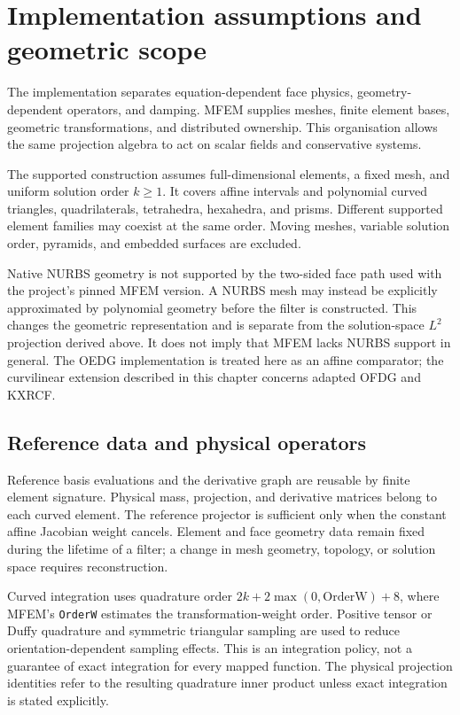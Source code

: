 \section{Implementation assumptions and geometric scope}
\label{chap:implementation}
\label{sec:support-boundary}
The implementation separates equation-dependent face physics, geometry-dependent
operators, and damping. MFEM supplies meshes, finite element bases, geometric
transformations, and distributed ownership. This organisation allows the same
projection algebra to act on scalar fields and conservative systems.

The supported construction assumes full-dimensional elements, a fixed mesh,
and uniform solution order $k\geq1$. It covers affine intervals and polynomial
curved triangles, quadrilaterals, tetrahedra, hexahedra, and prisms. Different
supported element families may coexist at the same order. Moving meshes,
variable solution order, pyramids, and embedded surfaces are excluded.

Native NURBS geometry is not supported by the two-sided face path used with
the project's pinned MFEM version. A NURBS mesh may instead be explicitly
approximated by polynomial geometry before the filter is constructed. This
changes the geometric representation and is separate from the solution-space
$L^2$ projection derived above. It does not imply that MFEM lacks NURBS support
in general. The OEDG implementation is treated here as an affine comparator;
the curvilinear extension described in this chapter concerns adapted OFDG
and KXRCF.

\subsection{Reference data and physical operators}
\label{sec:curved-construction}
Reference basis evaluations and the derivative graph are reusable by finite
element signature. Physical mass, projection, and derivative matrices belong
to each curved element. The reference projector is sufficient only when the
constant affine Jacobian weight cancels. Element and face geometry data remain
fixed during the lifetime of a filter; a change in mesh geometry, topology, or
solution space requires reconstruction.

Curved integration uses quadrature order
$2k+2\max(0,\mathrm{OrderW})+8$, where MFEM's \texttt{OrderW} estimates the
transformation-weight order. Positive tensor or Duffy quadrature and symmetric
triangular sampling are used to reduce orientation-dependent sampling effects.
This is an integration policy, not a guarantee of exact integration for every
mapped function. The physical projection identities refer to the resulting
quadrature inner product unless exact integration is stated explicitly.

